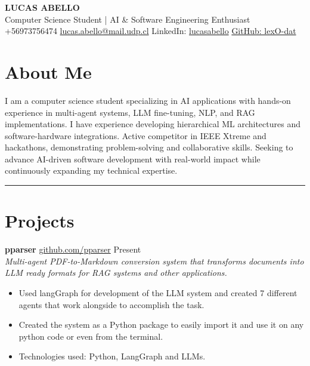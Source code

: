 \documentclass[a4paper,11pt]{article}
\begin{document}
\small %
\begin{center}
    {\LARGE \textbf{LUCAS ABELLO}}\\
    \vspace{0.2cm}
    Computer Science Student | AI \& Software Engineering Enthusiast\\
    \vspace{0.2cm}
    +56973756474 \textbullet{} \href{mailto:lucas.abello@mail.udp.cl}{lucas.abello@mail.udp.cl} \textbullet{} LinkedIn: \href{https://www.linkedin.com/in/lucasabello/}{lucasabello} \textbullet{} \href{https://github.com/lexO-dat}{GitHub: lexO-dat}
\end{center}

\section*{About Me}
I am a computer science student specializing in AI applications with hands-on experience in multi-agent systems, LLM fine-tuning, NLP, and RAG implementations. I have experience developing hierarchical ML architectures and software-hardware integrations. Active competitor in IEEE Xtreme and hackathons, demonstrating problem-solving and collaborative skills. Seeking to advance AI-driven software development with real-world impact while continuously expanding my technical expertise.
\\
\rule{\linewidth}{0.1pt}

\section*{Projects}

\textbf{pparser} \href{https://github.com/lexO-dat/pparser}{github.com/pparser} \hfill Present \\
\textit{ Multi-agent PDF-to-Markdown conversion system that transforms documents into LLM ready formats for RAG systems and other applications.} 
\begin{itemize}
    \item Used langGraph for development of the LLM system and created 7 different agents that work alongside to accomplish the task.
    \item Created the system as a Python package to easily import it and use it on any python code or even from the terminal.
    \item Technologies used: Python, LangGraph and LLMs.
\end{itemize}
\end{document}

